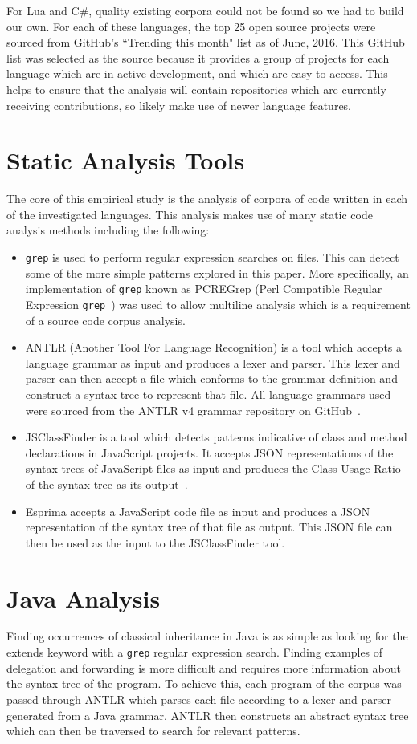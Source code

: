 For Lua and C\#, quality existing corpora could not be found so we had to build our own. For each of these languages, the top 25 open source projects were sourced from GitHub's ``Trending this month" list as of June, 2016. This GitHub list was selected as the source because it provides a group of projects for each language which are in active development, and which are easy to access. This helps to ensure that the analysis will contain repositories which are currently receiving contributions, so likely make use of newer language features.

\section{Static Analysis Tools}
The core of this empirical study is the analysis of corpora of code written in each of the investigated languages. This analysis makes use of many static code analysis methods including the following:
\begin{itemize}
	\item \texttt{grep} is used to perform regular expression searches on files. This can detect some of the more simple patterns explored in this paper. More specifically, an implementation of \texttt{grep} known as PCREGrep (Perl Compatible Regular Expression \texttt{grep}~\cite{Pcregrep}) was used to allow multiline analysis which is a requirement of a source code corpus analysis.
	\item ANTLR (Another Tool For Language Recognition) is a tool which accepts a language grammar as input and produces a lexer and parser. This lexer and parser can then accept a file which conforms to the grammar definition and construct a syntax tree to represent that file. All language grammars used were sourced from the ANTLR v4 grammar repository on GitHub~\cite{AntlrGrammars}.
	\item JSClassFinder is a tool which detects patterns indicative of class and method declarations in JavaScript projects. It accepts JSON representations of the syntax trees of JavaScript files as input and produces the Class Usage Ratio of the syntax tree as its output~\cite{JSClassFinder}.
	\item Esprima accepts a JavaScript code file as input and produces a JSON representation of the syntax tree of that file as output. This JSON file can then be used as the input to the JSClassFinder tool.
\end{itemize}

\section{Java Analysis}
Finding occurrences of classical inheritance in Java is as simple as looking for the extends keyword with a \texttt{grep} regular expression search. Finding examples of delegation and forwarding is more difficult and requires more information about the syntax tree of the program. To achieve this, each program of the corpus was passed through ANTLR which parses each file according to a lexer and parser generated from a Java grammar. ANTLR then constructs an abstract syntax tree which can then be traversed to search for relevant patterns.
\newline

